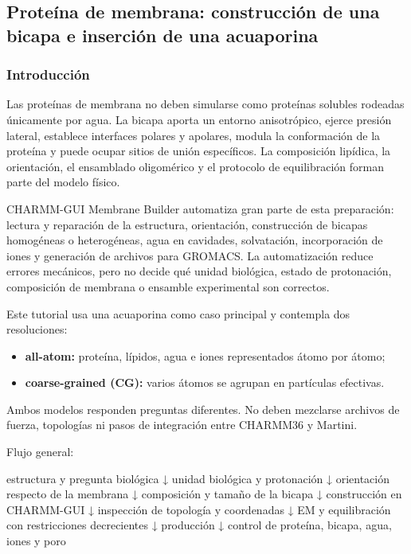 \documentclass[
  spanish,
  11pt,
  a4paper]{article}
\newenvironment{Shaded}{\begin{snugshade}}{\end{snugshade}}
\newcommand{\NormalTok}[1]{#1}
\providecommand{\tightlist}{%
  \setlength{\itemsep}{0pt}\setlength{\parskip}{0pt}}
\begin{document}
\subsection{Proteína de membrana: construcción de una bicapa e inserción
de una
acuaporina}\label{proteuxedna-de-membrana-construcciuxf3n-de-una-bicapa-e-inserciuxf3n-de-una-acuaporina}

\subsubsection{Introducción}\label{introducciuxf3n}

Las proteínas de membrana no deben simularse como proteínas solubles
rodeadas únicamente por agua. La bicapa aporta un entorno anisotrópico,
ejerce presión lateral, establece interfaces polares y apolares, modula
la conformación de la proteína y puede ocupar sitios de unión
específicos. La composición lipídica, la orientación, el ensamblado
oligomérico y el protocolo de equilibración forman parte del modelo
físico.

CHARMM-GUI Membrane Builder automatiza gran parte de esta preparación:
lectura y reparación de la estructura, orientación, construcción de
bicapas homogéneas o heterogéneas, agua en cavidades, solvatación,
incorporación de iones y generación de archivos para GROMACS. La
automatización reduce errores mecánicos, pero no decide qué unidad
biológica, estado de protonación, composición de membrana o ensamble
experimental son correctos.

Este tutorial usa una acuaporina como caso principal y contempla dos
resoluciones:

\begin{itemize}
\tightlist
\item
  \textbf{all-atom:} proteína, lípidos, agua e iones representados átomo
  por átomo;
\item
  \textbf{coarse-grained (CG):} varios átomos se agrupan en partículas
  efectivas.
\end{itemize}

Ambos modelos responden preguntas diferentes. No deben mezclarse
archivos de fuerza, topologías ni pasos de integración entre CHARMM36 y
Martini.

Flujo general:

\begin{Shaded}
\begin{Highlighting}[]
\NormalTok{estructura y pregunta biológica}
\NormalTok{    ↓}
\NormalTok{unidad biológica y protonación}
\NormalTok{    ↓}
\NormalTok{orientación respecto de la membrana}
\NormalTok{    ↓}
\NormalTok{composición y tamaño de la bicapa}
\NormalTok{    ↓}
\NormalTok{construcción en CHARMM{-}GUI}
\NormalTok{    ↓}
\NormalTok{inspección de topología y coordenadas}
\NormalTok{    ↓}
\NormalTok{EM y equilibración con restricciones decrecientes}
\NormalTok{    ↓}
\NormalTok{producción}
\NormalTok{    ↓}
\NormalTok{control de proteína, bicapa, agua, iones y poro}
\end{Highlighting}
\end{Shaded}
\end{document}

